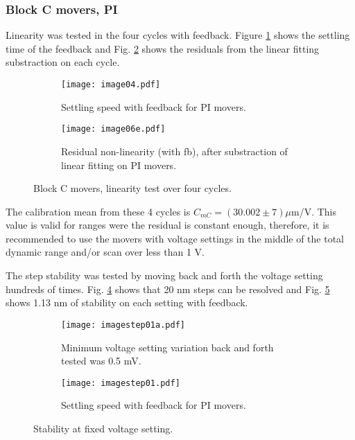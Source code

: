 \subsubsection{Block C movers, PI}
Linearity was tested in the four cycles with feedback. Figure \ref{f:PImsteps} shows the settling time of the feedback and Fig. \ref{f:PIlinres} shows the residuals from the linear fitting substraction on each cycle.\par
\begin{figure}[!htb]
 \centering\hspace*{-0.6cm}
\begin{subfigure}{0.4\textwidth}
 \texttt{[image: image04.pdf]}\caption{Settling speed with feedback for PI movers.}\label{f:PImsteps}
\end{subfigure}\hspace*{1.5cm}
\begin{subfigure}{0.4\textwidth}
 \texttt{[image: image06e.pdf]}\caption{Residual non-linearity (with fb), after substraction of linear fitting on PI movers.}\label{f:PIlinres}
\end{subfigure}\caption{Block C movers, linearity test over four cycles.}\label{f:PIfeedback}
\end{figure}
The calibration mean from these 4 cycles is $C_{mC} = (30.002\pm7)\mu$m/V. This value is valid for ranges were the residual is constant enough, therefore, it is recommended to use the movers with voltage settings in the middle of the total dynamic range and/or scan over less than 1 V.\par
The step stability was tested by moving back and forth the voltage setting hundreds of times. Fig. \ref{f:PIstepstab} shows that 20 nm steps can be resolved and Fig. \ref{f:PIstab} shows 1.13 nm of stability on each setting with feedback.\par
\begin{figure}[!htb]
 \centering\hspace*{-0.6cm}
\begin{subfigure}{0.4\textwidth}
\texttt{[image: imagestep01a.pdf]}\caption{Minimum voltage setting variation back and forth tested was 0.5 mV.}\label{f:PIstepstab}
\end{subfigure}\hspace*{1.5cm}
\begin{subfigure}{0.4\textwidth}
 \texttt{[image: imagestep01.pdf]}\caption{Settling speed with feedback for PI movers.}\label{f:PIstab}
\end{subfigure}\caption{Stability at fixed voltage setting.}\label{f:PIstability}
\end{figure}
